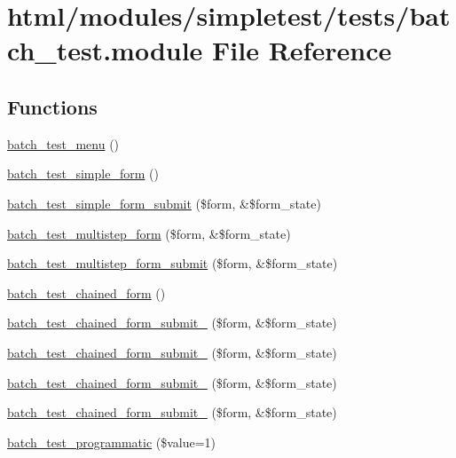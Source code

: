 \hypertarget{batch__test_8module}{
\section{html/modules/simpletest/tests/batch\_\-test.module File Reference}
\label{batch__test_8module}
}
\subsection*{Functions}
\begin{DoxyCompactItemize}
\item 
\hyperlink{batch__test_8module_a28889fc66f995e44f0182c17f456f055}{batch\_\-test\_\-menu} ()
\item 
\hyperlink{batch__test_8module_aed91a59cbf3865c50524af68cff9ac7f}{batch\_\-test\_\-simple\_\-form} ()
\item 
\hyperlink{batch__test_8module_a33858cdd91ddd2934ac581fd8e8b4ece}{batch\_\-test\_\-simple\_\-form\_\-submit} (\$form, \&\$form\_\-state)
\item 
\hyperlink{batch__test_8module_a27849d728f8dc56be2efe444f247a20f}{batch\_\-test\_\-multistep\_\-form} (\$form, \&\$form\_\-state)
\item 
\hyperlink{batch__test_8module_a8bd0a1b56d07df11f2978d71a035d811}{batch\_\-test\_\-multistep\_\-form\_\-submit} (\$form, \&\$form\_\-state)
\item 
\hyperlink{batch__test_8module_afcbe5152f11e210c96de10123a41f518}{batch\_\-test\_\-chained\_\-form} ()
\item 
\hyperlink{batch__test_8module_a2f5996696bbb4db0285667a7e9d12f41}{batch\_\-test\_\-chained\_\-form\_\-submit\_} (\$form, \&\$form\_\-state)
\item 
\hyperlink{batch__test_8module_a7d6ba1cbb121fc9a6f908897aac34bdc}{batch\_\-test\_\-chained\_\-form\_\-submit\_} (\$form, \&\$form\_\-state)
\item 
\hyperlink{batch__test_8module_a1b6b2d190b2fe94b61a63f448dbef2d7}{batch\_\-test\_\-chained\_\-form\_\-submit\_} (\$form, \&\$form\_\-state)
\item 
\hyperlink{batch__test_8module_a9060ee2b4e66f050cb62864a8445fa8b}{batch\_\-test\_\-chained\_\-form\_\-submit\_} (\$form, \&\$form\_\-state)
\item 
\hyperlink{batch__test_8module_adda6d95301653091f90c0117b69af063}{batch\_\-test\_\-programmatic} (\$value=1)
\item 

\end{DoxyCompactItemize}
